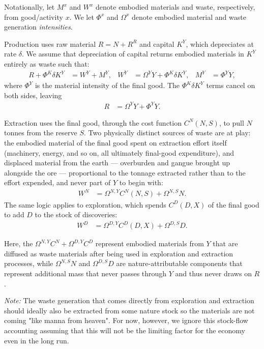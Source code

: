 Notationally, let $M^x$ and $W^x$ denote embodied materials and waste, respectively, from good/activity $x$. We let $\Phi^x$ and $\Omega^x$ denote embodied material and waste generation \emph{intensities}.

Production uses raw material $R=N+R^R$ and capital $K^Y$, which depreciates at rate $\delta$. We assume that depreciation of capital returns embodied materials in $K^Y$ entirely as waste such that:
\begin{align}
    R+\Phi^K\delta K^Y &= W^Y+M^Y, &
W^Y &= \Omega^YY+\Phi^K\delta K^Y, &
M^Y &= \Phi^YY,
\label{eq:sp:setup:production}
\end{align}
where $\Phi^Y$ is the material intensity of the final good. The $\Phi^K\delta K^Y$ terms cancel on both sides, leaving
\begin{align}
R &= \Omega^YY+\Phi^YY.
\label{eq:sp:setup:production-reduced}
\end{align}


 Extraction uses the final good, through the cost function $C^N(N,S)$, to pull $N$ tonnes from the reserve $S$. Two physically distinct sources of waste are at play: the embodied material of the final good spent on extraction effort itself (machinery, energy, and so on, all ultimately final-good expenditure), and displaced material from the earth --- overburden and gangue brought up alongside the ore --- proportional to the tonnage extracted rather than to the effort expended, and never part of $Y$ to begin with:
\begin{align}
W^N &= \Omega^{N,Y}C^N(N,S)+\Omega^{N,S}N.
\label{eq:sp:setup:extraction}
\end{align}
The same logic applies to exploration, which spends $C^D(D,X)$ of the final good to add $D$ to the stock of discoveries:
\begin{align}
W^D &= \Omega^{D,Y}C^D(D,X)+\Omega^{D,S}D.
\label{eq:sp:setup:exploration}
\end{align}

Here, the $\Omega^{N,Y}C^N+\Omega^{D,Y}C^D$ represent embodied materials from $Y$ that are diffused as waste materials after being used in exploration and extraction processes, while $\Omega^{N,S} N $ and $\Omega^{D,S} D$ are nature-attributable components that represent additional mass that never passes through $Y$ and thus never draws on $R$. 

\textit{Note:} The waste generation that comes directly from exploration and extraction should ideally also be extracted from some nature stock so the materials are not coming "like manna from heaven". For now, however, we ignore this stock-flow accounting assuming that this will not be the limiting factor for the economy even in the long run.





